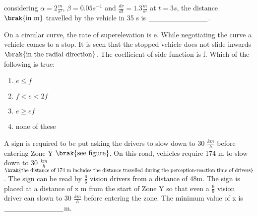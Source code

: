 considering $\alpha = 2 \frac{m}{s^2}$, $\beta = 0.05 s^{-1}$ and $\frac{dv}{dt} = 1.3 \frac{m}{s^2}$ at $t = 3 s$, the distance $\brak{\text{in m}}$ travelled by the vehicle in 35 s is $\makebox[3cm][l]{\underline{\hspace{3cm}}}$.

\item On a circular curve, the rate of superelevation is e. While negotiating the curve a vehicle comes to a stop. It is seen that the stopped vehicle does not slide inwards $\brak{\text{in the radial direction}}$. The coefficient of side function is f. Which of the following is true:
\begin{enumerate}
    \item $e \leq f$
    \item $f < e < 2f$
    \item $e \geq ef$
    \item none of these
\end{enumerate}
\item A sign is required to be put asking the drivers to slow down to 30 $\frac{km}{h}$
before entering Zone Y $\brak{\text{see figure}}$. On this road, vehicles require 174 m to slow down to 30 $\frac{km}{h}$ $\brak{\text{the distance of 174 m includes the distance travelled during the perception-reaction time of drivers}}$. The sign can be read by $\frac{6}{6}$ vision drivers from a distance of 48m. The sign is placed at a distance of x m from the start of Zone Y so that even a $\frac{6}{9}$ vision driver can slown to 30 $\frac{km}{h}$ before entering the zone. The minimum value of x is $\makebox[3cm][l]{\underline{\hspace{3cm}}} $m.\\

